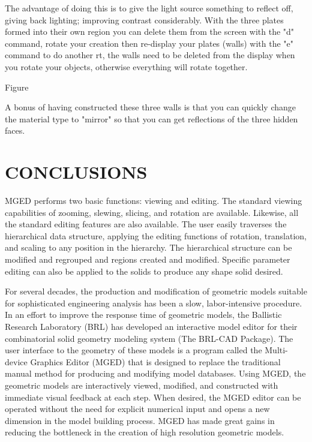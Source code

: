 The advantage of doing this is to give the light source something
to reflect off, giving back lighting; improving contrast considerably.
With the
three plates formed into their own region you can delete them from the screen
with the "d" command, rotate your creation then re-display your plates (walls)
with the "e" command to do another rt, the walls need to be deleted from the
display when you rotate your objects,
otherwise everything will rotate together.

                                   Figure

A bonus of having constructed these three walls is that you can quickly
change the material type to "mirror" so that you can get reflections of the
three hidden faces.

\chapter{CONCLUSIONS}

MGED performs two basic functions:
viewing and editing.
The standard viewing capabilities of zooming, slewing,
slicing, and rotation are available.
Likewise, all the standard editing features are also available.
The user easily traverses the hierarchical data structure, applying
the editing functions of rotation, translation, and scaling to any
position in the hierarchy.
The hierarchical structure can be modified and regrouped and regions
created and modified.
Specific parameter editing can also be applied to the solids to produce
any shape solid desired.

For several decades, the production and modification of geometric models
suitable for sophisticated engineering analysis
has been a slow, labor-intensive procedure.
In an effort to improve the response time of geometric models,
the Ballistic
Research Laboratory (BRL) has developed an interactive model editor
for their combinatorial solid geometry modeling system (The BRL-CAD Package).
The user interface to the geometry of these models
is a program called the Multi-device Graphics Editor (MGED)
that is designed to replace the
traditional manual method
for producing and modifying model databases.
Using MGED, the geometric models
are interactively viewed, modified, and constructed with immediate visual
feedback at each step.
When desired, the MGED editor can be operated without the need for
explicit numerical input
and opens a new dimension in the model building process.
MGED has made great gains in reducing the bottleneck in
the creation of high resolution geometric models.

